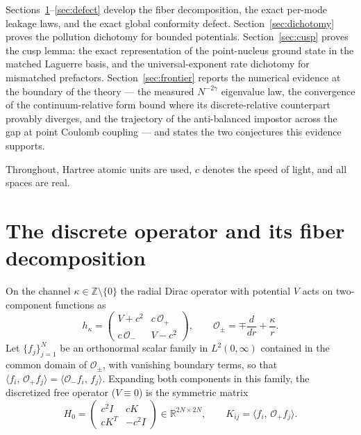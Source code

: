 \documentclass[11pt,reqno]{amsart}
\theoremstyle{definition}
\theoremstyle{remark}
\newcommand{\R}{\mathbb{R}}
\newcommand{\Op}{\mathcal{O}}
\newcommand{\ip}[2]{\langle #1,\,#2\rangle}
\begin{document}
Sections~\ref{sec:fiber}--\ref{sec:defect} develop the fiber
decomposition, the exact per-mode leakage laws, and the exact global
conformity defect. Section~\ref{sec:dichotomy} proves the pollution
dichotomy for bounded potentials. Section~\ref{sec:cusp} proves the
cusp lemma: the exact representation of the point-nucleus ground state
in the matched Laguerre basis, and the universal-exponent rate
dichotomy for mismatched prefactors. Section~\ref{sec:frontier} reports
the numerical evidence at the boundary of the theory --- the measured
$N^{-2\gamma}$ eigenvalue law, the convergence of the continuum-relative
form bound where its discrete-relative counterpart provably diverges,
and the trajectory of the anti-balanced impostor across the gap at
point Coulomb coupling --- and states the two conjectures this evidence
supports.

Throughout, Hartree atomic units are used, $c$ denotes the speed of
light, and all spaces are real.

\section{The discrete operator and its fiber decomposition}
\label{sec:fiber}

On the channel $\kappa\in\mathbb{Z}\setminus\{0\}$ the radial Dirac
operator with potential $V$ acts on two-component functions as
\begin{equation}
h_{\kappa}=
\begin{pmatrix}
V+c^{2} & c\,\Op_{+}\\
c\,\Op_{-} & V-c^{2}
\end{pmatrix},
\qquad
\Op_{\pm}=\mp\frac{d}{dr}+\frac{\kappa}{r}.
\label{eq:hk}
\end{equation}
Let $\{f_{j}\}_{j=1}^{N}$ be an orthonormal scalar family in
$L^{2}(0,\infty)$ contained in the common domain of $\Op_{\pm}$, with
vanishing boundary terms, so that
$\ip{f_{i}}{\Op_{+}f_{j}}=\ip{\Op_{-}f_{i}}{f_{j}}$. Expanding both
components in this family, the discretized free operator ($V\equiv0$) is
the symmetric matrix
\begin{equation}
H_{0}=
\begin{pmatrix}
c^{2}I & cK\\
cK^{T} & -c^{2}I
\end{pmatrix}\in\R^{2N\times2N},
\qquad
K_{ij}=\ip{f_{i}}{\Op_{+}f_{j}}.
\label{eq:H0}
\end{equation}
\end{document}
